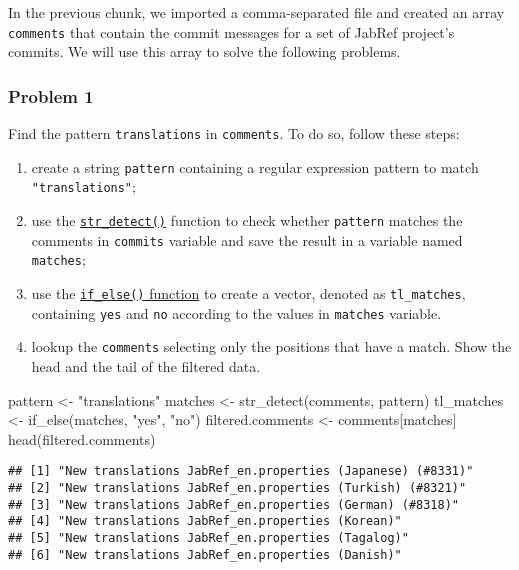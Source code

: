 \documentclass[
]{article}
\newenvironment{Shaded}{\begin{snugshade}}{\end{snugshade}}
\newcommand{\FunctionTok}[1]{\textcolor[rgb]{0.00,0.00,0.00}{#1}}
\newcommand{\NormalTok}[1]{#1}
\newcommand{\OtherTok}[1]{\textcolor[rgb]{0.56,0.35,0.01}{#1}}
\newcommand{\StringTok}[1]{\textcolor[rgb]{0.31,0.60,0.02}{#1}}
\providecommand{\tightlist}{%
  \setlength{\itemsep}{0pt}\setlength{\parskip}{0pt}}
\begin{document}
In the previous chunk, we imported a comma-separated file and created an
array \texttt{comments} that contain the commit messages for a set of
JabRef project's commits. We will use this array to solve the following
problems.

\hypertarget{problem-1}{%
\subsubsection{Problem 1}\label{problem-1}}

Find the pattern \texttt{translations} in \texttt{comments}. To do so,
follow these steps:

\begin{enumerate}
\def\labelenumi{\arabic{enumi}.}
\tightlist
\item
  create a string \texttt{pattern} containing a regular expression
  pattern to match \texttt{"translations"};
\item
  use the
  \href{https://stringr.tidyverse.org/reference/str_detect.html}{\texttt{str\_detect()}}
  function to check whether \texttt{pattern} matches the comments in
  \texttt{commits} variable and save the result in a variable named
  \texttt{matches};
\item
  use the
  \href{https://dplyr.tidyverse.org/reference/if_else.html}{\texttt{if\_else()}
  function} to create a vector, denoted as \texttt{tl\_matches},
  containing \texttt{yes} and \texttt{no} according to the values in
  \texttt{matches} variable.
\item
  lookup the \texttt{comments} selecting only the positions that have a
  match. Show the head and the tail of the filtered data.
\end{enumerate}

\begin{Shaded}
\begin{Highlighting}[]
\NormalTok{pattern }\OtherTok{\textless{}{-}} \StringTok{"translations"}
\NormalTok{matches }\OtherTok{\textless{}{-}} \FunctionTok{str\_detect}\NormalTok{(comments, pattern)}
\NormalTok{tl\_matches }\OtherTok{\textless{}{-}} \FunctionTok{if\_else}\NormalTok{(matches, }\StringTok{"yes"}\NormalTok{, }\StringTok{"no"}\NormalTok{)}
\NormalTok{filtered.comments }\OtherTok{\textless{}{-}}\NormalTok{ comments[matches]}
\FunctionTok{head}\NormalTok{(filtered.comments)}
\end{Highlighting}
\end{Shaded}

\begin{verbatim}
## [1] "New translations JabRef_en.properties (Japanese) (#8331)"
## [2] "New translations JabRef_en.properties (Turkish) (#8321)" 
## [3] "New translations JabRef_en.properties (German) (#8318)"  
## [4] "New translations JabRef_en.properties (Korean)"          
## [5] "New translations JabRef_en.properties (Tagalog)"         
## [6] "New translations JabRef_en.properties (Danish)"
\end{verbatim}
\end{document}

